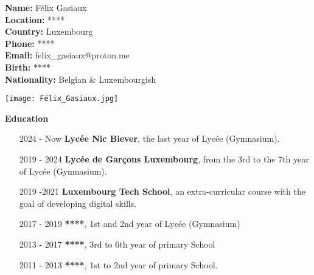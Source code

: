 \documentclass{article}
\begin{document}
\begin{minipage}[t]{0.4\textwidth}
    \begin{flushleft}
        \textbf{Name:} Félix Gasiaux \\
        \textbf{Location:} **** \\
        \textbf{Country:} Luxembourg\\
        \textbf{Phone:} **** \\
        \textbf{Email:} felix_gasiaux@proton.me\\
        \textbf {Birth:} **** \\
        \textbf{Nationality:} Belgian \& Luxembourgish\\

    \end{flushleft}
\end{minipage}%
\begin{minipage}{0.55\textwidth}
    \begin{flushright}
        \texttt{[image: Félix\_Gasiaux.jpg]}
    \end{flushright}
\end{minipage}





\vspace{0.5cm} %
\centering %
\dotfill \textbf{\Large Education} \dotfill
\vspace{0.5cm} %

\begin{minipage}[t]{0.7\textwidth}
    \begin{itemize}
         \item [2024 - Now] \textbf{Lycée Nic Biever},  the last year of Lycée (Gymnasium).
        \item [2019 - 2024] \textbf{Lycée de Garçons Luxembourg}, from the 3rd to the 7th year of Lycée (Gymnasium).
    	\item [2019 -2021 ] \textbf{Luxembourg Tech School}, an extra-curricular course with the goal of developing digital skills.
        \item [2017 - 2019] \textbf{****}, 1st and 2nd year of Lycée (Gymnasium)
        \item [2013 - 2017] \textbf{****}, 3rd to 6th year of primary School
        \item [2011 - 2013] \textbf{****}, 1st to 2nd year of primary School.

        \end{itemize}
\end{minipage}%
\end{document}
